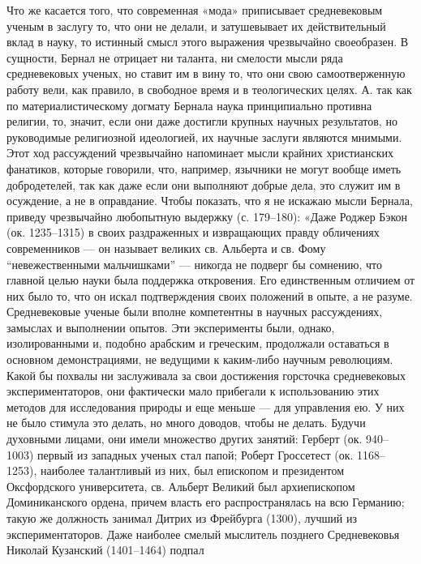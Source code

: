 Что же касается того, что современная «мода» приписывает средневековым
ученым  в   заслугу  то,  что   они  не  делали,  и   затушевывает  их
действительный  вклад  в  науку,  то истинный  смысл  этого  выражения
чрезвычайно своеобразен. В сущности, Бернал не отрицает ни таланта, ни
смелости мысли ряда средневековых ученых, но  ставит им в вину то, что
они  свою  самоотверженную  работу  вели,  как  правило,  в  свободное
время  и в  теологических  целях. А.  так  как по  материалистическому
догмату  Бернала наука  принципиально  противна  религии, то,  значит,
если  они даже  достигли крупных  научных результатов,  но руководимые
религиозной  идеологией, их  научные  заслуги  являются мнимыми.  Этот
ход  рассуждений  чрезвычайно  напоминает мысли  крайних  христианских
фанатиков, которые  говорили, что, например, язычники  не могут вообще
иметь добродетелей, так  как даже если они выполняют  добрые дела, это
служит им  в осуждение, а  не в оправдание.  Чтобы показать, что  я не
искажаю  мысли Бернала,  приведу чрезвычайно  любопытную выдержку  (с.
179--180): «Даже Роджер Бэкон (ок.  1235--1315) в своих раздраженных и
извращающих правду  обличениях современников  --- он  называет великих
св. Альберта  и св.  Фому ``невежественными мальчишками''  --- никогда
не  подверг  бы  сомнению,  что главной  целью  науки  была  поддержка
откровения. Его  единственным отличием  от них было  то, что  он искал
подтверждения  своих положений  в  опыте, а  не разуме.  Средневековые
ученые  были вполне  компетентны  в научных  рассуждениях, замыслах  и
выполнении  опытов.  Эти  эксперименты  были,  однако,  изолированными
и,  подобно арабским  и  греческим, продолжали  оставаться в  основном
демонстрациями, не ведущими к  каким-либо научным революциям. Какой бы
похвалы  ни заслуживала  за  свои  достижения горсточка  средневековых
экспериментаторов, они фактически мало  прибегали к использованию этих
методов  для исследования  природы  и еще  меньше  --- для  управления
ею.  У  них не  было  стимула  это  делать,  но много  доводов,  чтобы
не  делать.  Будучи  духовными  лицами,  они  имели  множество  других
занятий: Герберт (ок. 940--1003) первый из западных ученых стал папой;
Роберт  Гроссетест  (ок.  1168--1253), наиболее  талантливый  из  них,
был  епископом и  президентом Оксфордского  университета, св.  Альберт
Великий  был архиепископом  Доминиканского ордена,  причем власть  его
распространялась на всю Германию; такую же должность занимал Дитрих из
Фрейбурга (1300),  лучший из  экспериментаторов. Даже  наиболее смелый
мыслитель позднего Средневековья Николай Кузанский (1401--1464) подпал
